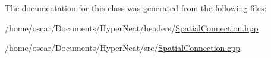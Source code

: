 The documentation for this class was generated from the following files\-:\begin{DoxyCompactItemize}
\item 
/home/oscar/\-Documents/\-Hyper\-Neat/headers/\hyperlink{_spatial_connection_8hpp}{Spatial\-Connection.\-hpp}\item 
/home/oscar/\-Documents/\-Hyper\-Neat/src/\hyperlink{_spatial_connection_8cpp}{Spatial\-Connection.\-cpp}\end{DoxyCompactItemize}
